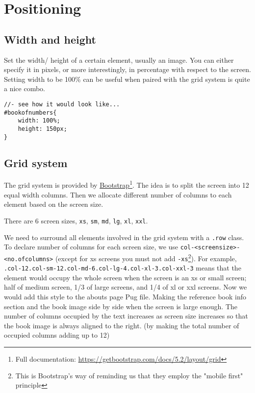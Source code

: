 \section{Positioning}

\subsection{Width and height}
\label{sec:width}

Set the width/ height of a certain element, usually an image. You can either specify it in pixels, or more interestingly, in percentage with respect to the screen. Setting width to be 100\% can be useful when paired with the grid system is quite a nice combo.

\begin{lstlisting}[language=pug]
//- see how it would look like...
#bookofnumbers{
    width: 100%;
    height: 150px;
}
\end{lstlisting}

\subsection{Grid system}
\label{sec:grid}

The grid system is provided by \href{https://getbootstrap.com/docs/5.2/layout/grid}{Bootstrap}\footnote{Full documentation: \url{https://getbootstrap.com/docs/5.2/layout/grid}}. The idea is to split the screen into 12 equal width columns. Then we allocate different number of columns to each element based on the screen size.

There are 6 screen sizes, \texttt{xs}, \texttt{sm}, \texttt{md}, \texttt{lg}, \texttt{xl}, \texttt{xxl}.

We need to surround all elements involved in the grid system with a \texttt{.row} class. To declare number of columns for each screen size, we use \texttt{col-<screensize>-\hfill \break <no.ofcolumns>} (except for xs screens you must not add \texttt{-xs}\footnote{This is Bootstrap's way of reminding us that they employ the "mobile first" principle}). For example, \texttt{.col-12.col-sm-12.col-md-6.col-lg-4.col-xl-3.col-xxl-3} means that the element would occupy the whole screen when the screen is an xs or small screen; half of medium screen, 1/3 of large screens, and 1/4 of xl or xxl screens. Now we would add this style to the abouts page Pug file. Making the reference book info section and the book image side by side when the screen is large enough. The number of columns occupied by the text increases as screen size increases so that the book image is always aligned to the right. (by making the total number of occupied columns adding up to 12)
\vspace{6mm}

